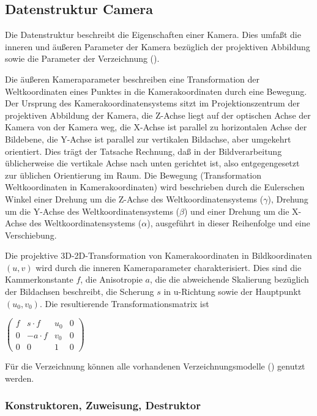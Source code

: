\subsection{Datenstruktur Camera}
\label{Camera}
\hypertarget{Camera}{}
Die Datenstruktur  beschreibt die Eigenschaften einer Kamera. Dies
umfaßt die inneren und äußeren Parameter der Kamera bezüglich der projektiven
Abbildung sowie die Parameter der Verzeichnung ().

Die äußeren Kameraparameter beschreiben eine Transformation der
Weltkoordinaten eines Punktes in die Kamerakoordinaten durch eine Bewegung. 
Der Ursprung des Kamerakoordinatensystems sitzt im Projektionszentrum der 
projektiven Abbildung der Kamera, die Z-Achse liegt auf der optischen Achse
der Kamera von der Kamera weg, die X-Achse ist parallel zu horizontalen 
Achse der Bildebene, die Y-Achse ist parallel zur vertikalen Bildachse, aber
umgekehrt orientiert. Dies trägt der Tatsache Rechnung, daß in der
Bildverarbeitung üblicherweise die vertikale Achse nach unten gerichtet ist,
also entgegengesetzt zur üblichen Orientierung im Raum.
Die Bewegung (Transformation Weltkoordinaten in Kamerakoordinaten) wird
beschrieben durch die Eulerschen Winkel einer Drehung um die Z-Achse des
Weltkoordinatensystems ($\gamma$), Drehung um die Y-Achse des
Weltkoordinatensystems ($\beta$) und einer Drehung um die X-Achse des
Weltkoordinatensystems ($\alpha$), ausgeführt in dieser Reihenfolge und eine
Verschiebung. 

Die projektive 3D-2D-Transformation von Kamerakoordinaten in Bildkoordinaten
$(u,v)$ wird durch die inneren Kameraparameter charakterisiert. 
Dies sind die Kammerkonstante $f$, die Anisotropie $a$, die die abweichende
Skalierung bezüglich der Bildachsen beschreibt, die Scherung $s$ in u-Richtung
sowie der Hauptpunkt $(u_0,v_0)$. Die resultierende Transformationsmatrix ist
\centerline{
$\left( 
\begin{array}{cccc}
f & s \cdot f & u_0 & 0\\
0 & -a \cdot f & v_0 & 0\\
0 & 0 & 1 & 0
\end{array} 
 \right)$}

Für die Verzeichnung können alle vorhandenen Verzeichnungsmodelle
() genutzt werden.

\subsubsection{Konstruktoren, Zuweisung, Destruktor}

